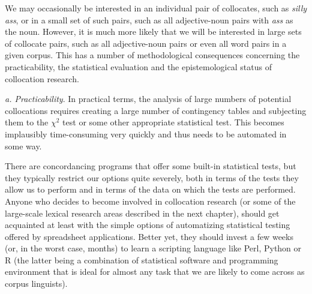 We may occasionally be interested in an individual pair of collocates,  such as \textit{silly ass}, or in a small set of such pairs, such as all adjective\hyp{}noun  pairs with \textit{ass} as the noun. However, it is much more likely that we will be interested in large sets of collocate pairs, such as all adjective\hyp{}noun  pairs or even all word pairs in a given corpus. This has a number of methodological consequences concerning the practicability, the statistical evaluation and the epistemological  status of collocation  research.

\textit{a. Practicability}. In practical terms, the analysis of large numbers of potential collocations  requires creating a large number of contingency  tables and subjecting them to the $\chi^2$  test or some other appropriate statistical test. This becomes implausibly time\hyp{}consuming very quickly and thus needs to be automated in some way.

There are concordancing  programs that offer some built\hyp{}in statistical tests, but they typically restrict our options quite severely, both in terms of the tests they allow us to perform and in terms of the data on which the tests are performed. Anyone who decides to become involved in collocation  research (or some of the large\hyp{}scale lexical research areas described in the next chapter), should get acquainted at least with the simple options of automatizing statistical testing offered by spreadsheet applications. Better yet, they should invest a few weeks (or, in the worst case, months) to learn a scripting language like Perl, Python or R (the latter being a combination of statistical software and programming environment that is ideal for almost any task that we are likely to come across as corpus linguists).

